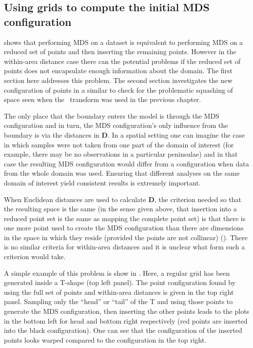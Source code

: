 \subsection{Using grids to compute the initial MDS configuration}

 shows that performing MDS on a dataset is equivalent to performing MDS on a reduced set of points and then inserting the remaining points. However in the within-area distance case there can the potential problems if the reduced set of points does not encapsulate enough information about the domain. The first section here addresses this problem. The second section investigates the new configuration of points in a similar to check for the problematic squashing of space seen when the \sch\ transform was used in the previous chapter.

\label{grids}

The only place that the boundary enters the model is through the MDS configuration and in turn, the MDS configuration's only influence from the boundary is via the distances in $\mathbf{D}$. In a spatial setting one can imagine the case in which samples were not taken from one part of the domain of interest (for example, there may be no observations in a particular peninsulae) and in that case the resulting MDS configuration would differ from a configuration when data from the whole domain was used. Ensuring that different analyses on the same domain of interest yield consistent results is extremely important.

When Euclidean distances are used to calculate $\mathbf{D}$, the criterion needed so that the resulting space is the same (in the sense given above, that insertion into a reduced point set is the same as mapping the complete point set) is that there is one more point used to create the MDS configuration than there are dimensions in the space in which they reside (provided the points are not collinear) (\cite{landmark}). There is no similar criteria for within-area distances and it is unclear what form such a criterion would take.

A simple example of this problem is show in . Here, a regular grid has been generated inside a T-shape (top left panel). The point configuration found by using the full set of points and within-area distances is given in the top right panel. Sampling only the ``head'' or ``tail'' of the T and using those points to generate the MDS  configuration, then inserting the other points leads to the plots in the bottom left for head and bottom right respectively (red points are inserted into the black configuration). One can see that the configuration of the inserted points looks warped compared to the configuration in the top right. 

